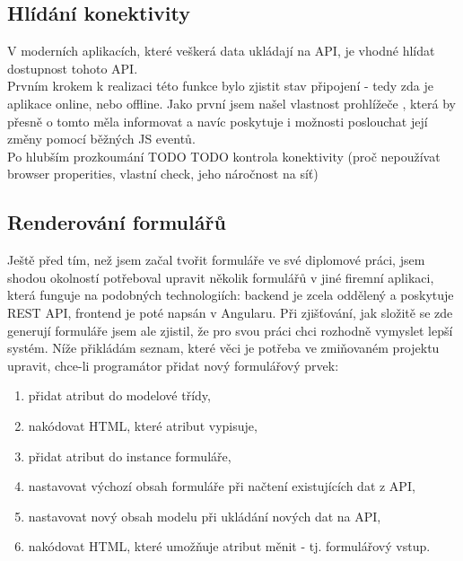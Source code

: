 \subsection{Hlídání konektivity}

V moderních aplikacích, které veškerá data ukládají na API, je vhodné hlídat dostupnost tohoto API.\\
Prvním krokem k realizaci této funkce bylo zjistit stav připojení - tedy zda je aplikace online, nebo offline. Jako první jsem našel vlastnost prohlížeče  \cite{online}, která by přesně o tomto měla informovat a navíc poskytuje i možnosti poslouchat její změny pomocí běžných JS eventů.\\
Po hlubším prozkoumání TODO
TODO kontrola konektivity (proč nepoužívat browser properities, vlastní check, jeho náročnost na síť)


\subsection{Renderování formulářů}

Ještě před tím, než jsem začal tvořit formuláře ve své diplomové práci, jsem shodou okolností potřeboval upravit několik formulářů v jiné firemní aplikaci, která funguje na podobných technologiích: backend je zcela oddělený a poskytuje REST API, frontend je poté napsán v Angularu. Při zjišťování, jak složitě se zde generují formuláře jsem ale zjistil, že pro svou práci chci rozhodně vymyslet lepší systém. Níže přikládám seznam, které věci je potřeba ve zmiňovaném projektu upravit, chce-li programátor přidat nový formulářový prvek:

\begin{enumerate}
    \item přidat atribut do modelové třídy,
    \item nakódovat HTML, které atribut vypisuje,
    \item přidat atribut do instance formuláře,
    \item nastavovat výchozí obsah formuláře při načtení existujících dat z API,
    \item nastavovat nový obsah modelu při ukládání nových dat na API,
    \item nakódovat HTML, které umožňuje atribut měnit - tj. formulářový vstup.
\end{enumerate}

